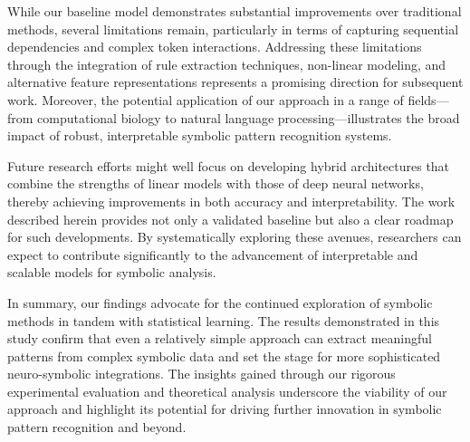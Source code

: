 \documentclass{article}
\begin{document}
While our baseline model demonstrates substantial improvements over traditional methods, several limitations remain, particularly in terms of capturing sequential dependencies and complex token interactions. Addressing these limitations through the integration of rule extraction techniques, non-linear modeling, and alternative feature representations represents a promising direction for subsequent work. Moreover, the potential application of our approach in a range of fields—from computational biology to natural language processing—illustrates the broad impact of robust, interpretable symbolic pattern recognition systems.

Future research efforts might well focus on developing hybrid architectures that combine the strengths of linear models with those of deep neural networks, thereby achieving improvements in both accuracy and interpretability. The work described herein provides not only a validated baseline but also a clear roadmap for such developments. By systematically exploring these avenues, researchers can expect to contribute significantly to the advancement of interpretable and scalable models for symbolic analysis.

In summary, our findings advocate for the continued exploration of symbolic methods in tandem with statistical learning. The results demonstrated in this study confirm that even a relatively simple approach can extract meaningful patterns from complex symbolic data and set the stage for more sophisticated neuro-symbolic integrations. The insights gained through our rigorous experimental evaluation and theoretical analysis underscore the viability of our approach and highlight its potential for driving further innovation in symbolic pattern recognition and beyond.
\end{document}

